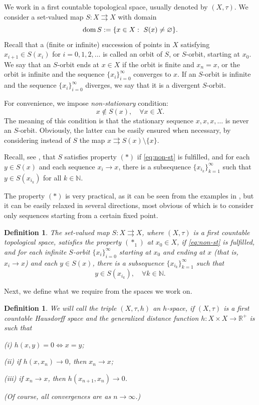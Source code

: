 \documentclass[12pt]{article}
\newtheorem{definition}[theorem]{Definition}
\def\dom{\mathop{\rm dom}}
\newcommand{\astorig}{(\ast)}
\newcommand{\astone}{(\ast_1)}
\newcommand{\R}{\mathbb{R}}
\renewcommand{\emptyset}{\varnothing}
\begin{document}
We work in a first countable topological space, usually denoted by $(X,\tau)$. We consider a set-valued map $S:X\rightrightarrows X$ with domain 
$$
    \dom S := \{x\in X:\ S(x) \neq \emptyset\}.
$$
Recall that a (finite or infinite) succession of points in $X$ satisfying $x_{i+1}\in S(x_i)$ for $i=0,1,2,\dots $ is called an orbit of $S$, or $S$-orbit, starting at $x_0$. We say that an $S$-orbit ends at $ x\in X$ if the orbit is finite and $x_n= x$, or the orbit is infinite and the sequence $\{x_i\}_{i=0}^\infty$ converges to $ x$. If an $S$-orbit is infinite and the sequence $\{x_i\}_{i=0}^\infty$ diverges, we say that it is a divergent $S$-orbit.

For convenience, we impose \emph{non-stationary} condition:
\begin{equation}
    \label{eq:non-st}
    x\not\in S(x),\quad\forall x\in X.
\end{equation}
The meaning of this condition is that the stationary sequence $x,x,x,\ldots$ is never an $S$-orbit. Obviously, the latter can be easily ensured when necessary, by considering instead of $S$ the map $x\rightrightarrows S(x)\setminus \{x\}$.

Recall, see \cite{Ivanov-Zlateva}, that $S$ satisfies property $\astorig$ if \eqref{eq:non-st} is fulfilled, and for each $y\in S(x)$ and each sequence $x_i\to x$, there is a subsequence $\{x_{i_k}\}_{k=1}^\infty$ such that $y \in S(x_{i_k})$ for all $k\in\mathbb{N}$.

The property $\astorig$ is very practical, as it can be seen from the examples in \cite{Ivanov-Zlateva}, but it can be easily relaxed in several directions, most obvious of which is to consider only sequences starting from a certain fixed point.

\begin{definition}
    \label{def:ast-1}
    The set-valued map $S:X\rightrightarrows X$, where $(X,\tau)$ is a first countable topological space, satisfies the property $\astone$ at $x_0\in X$, if  \eqref{eq:non-st} is fulfilled, and for each infinite $S$-orbit $\{x_i\}_{i=0}^\infty$ starting at $x_0$ and ending at $x$ (that is, $x_i\to x$) and each $y\in S(x)$, there is a subsequence $\{x_{i_k}\}_{k=1}^\infty$ such that
    $$
        y \in S(x_{i_k}),\quad\forall k\in\mathbb{N}.
    $$
\end{definition}

Next, we define what we require from the spaces we work on.

\begin{definition}
    \label{def:h-space}
    We will call the triple $(X,\tau,h)$ an $h$-\emph{space}, if $(X,\tau)$ is a first countable Hausdorff space and the generalized distance function $h:X\times X\to \R^+$ is such that

    (i) $h(x,y)=0 \Leftrightarrow  x=y$;

   (ii) if $h(x,x_n)\to 0$, then $x_n\to x$;

   (iii) if $x_n\to x$, then $h(x_{n+1},x_{n})\to 0$.

\noindent (Of course, all convergences are as $n\to\infty$.)
\end{definition}
\end{document}
